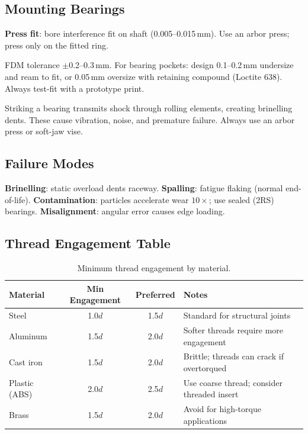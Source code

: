 \subsection{Mounting Bearings}
\textbf{Press fit}: bore interference fit on shaft (0.005--0.015\,mm). Use an arbor press; press only on the fitted ring.

\begin{tipbox}
FDM tolerance $\pm$0.2--0.3\,mm. For bearing pockets: design 0.1--0.2\,mm undersize and ream to fit, or 0.05\,mm oversize with retaining compound (Loctite 638). Always test-fit with a prototype print.
\end{tipbox}

\begin{warningbox}
Striking a bearing transmits shock through rolling elements, creating brinelling dents. These cause vibration, noise, and premature failure. Always use an arbor press or soft-jaw vise.
\end{warningbox}

\subsection{Failure Modes}
\textbf{Brinelling}: static overload dents raceway. \textbf{Spalling}: fatigue flaking (normal end-of-life). \textbf{Contamination}: particles accelerate wear $10\times$; use sealed (2RS) bearings. \textbf{Misalignment}: angular error causes edge loading.


\subsection{Thread Engagement Table}
\begin{table}[htbp]\centering\small
\begin{tabularx}{\textwidth}{l c c X}
\toprule
\textbf{Material} & \textbf{Min Engagement} & \textbf{Preferred} & \textbf{Notes} \\
\midrule
Steel & 1.0$d$ & 1.5$d$ & Standard for structural joints \\
Aluminum & 1.5$d$ & 2.0$d$ & Softer threads require more engagement \\
Cast iron & 1.5$d$ & 2.0$d$ & Brittle; threads can crack if overtorqued \\
Plastic (ABS) & 2.0$d$ & 2.5$d$ & Use coarse thread; consider threaded insert\index{threaded insert} \\
Brass & 1.5$d$ & 2.0$d$ & Avoid for high-torque applications \\
\bottomrule
\end{tabularx}
\caption{Minimum thread engagement by material.}
\end{table}


